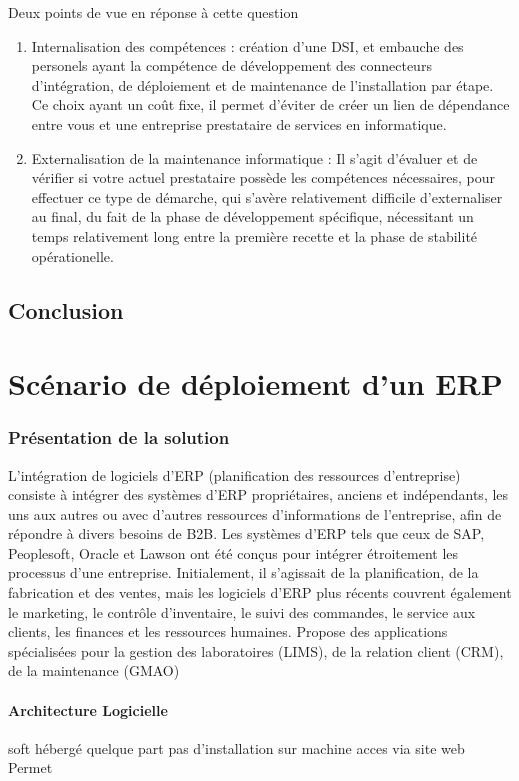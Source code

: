 Deux points de vue en réponse à cette question\\
\begin{enumerate}
\item Internalisation des compétences : création d'une DSI, et embauche des personels ayant la compétence de développement des connecteurs d'intégration, de déploiement et de maintenance de l'installation par étape. Ce choix ayant un coût fixe, il permet d'éviter de créer un lien de dépendance entre vous et une entreprise prestataire de services en informatique.
\item Externalisation de la maintenance informatique : Il s'agit d'évaluer et de vérifier si votre actuel prestataire possède les compétences nécessaires, pour effectuer ce type de démarche, qui s'avère relativement difficile d'externaliser au final, du fait de la phase de développement spécifique, nécessitant un temps relativement long entre la première recette et la phase de stabilité opérationelle.
\end{enumerate}

\subsection{Conclusion}


\section{Scénario de déploiement d'un ERP}

\subsubsection{Présentation de la solution}
L’intégration de logiciels d’ERP (planification des ressources d’entreprise) consiste à intégrer des systèmes d’ERP propriétaires, anciens et indépendants, les uns aux autres ou avec d’autres ressources d’informations de l’entreprise, afin de répondre à divers besoins de B2B. Les systèmes d’ERP tels que ceux de SAP, Peoplesoft, Oracle et Lawson ont été conçus pour intégrer étroitement les processus d’une entreprise. Initialement, il s’agissait de la planification, de la fabrication et des ventes, mais les logiciels d’ERP plus récents couvrent également le marketing, le contrôle d’inventaire, le suivi des commandes, le service aux clients, les finances et les ressources humaines.
Propose des applications spécialisées pour la gestion des laboratoires (LIMS), de la relation client (CRM), de la maintenance (GMAO)
\paragraph{Architecture Logicielle}
soft hébergé quelque part
pas d'installation sur machine
acces via site web
Permet 
